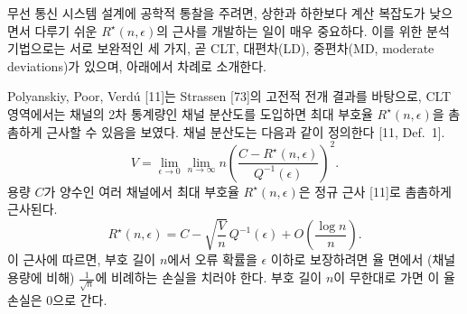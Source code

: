 무선 통신 시스템 설계에 공학적 통찰을 주려면, 상한과 하한보다 계산 복잡도가 낮으면서 다루기 쉬운 $R^\star(n,\epsilon)$의 근사를 개발하는 일이 매우 중요하다. 이를 위한 분석 기법으로는 서로 보완적인 세 가지, 곧 CLT, 대편차(LD), 중편차(MD, moderate deviations)가 있으며, 아래에서 차례로 소개한다.

Polyanskiy, Poor, Verdú [11]는 Strassen [73]의 고전적 전개 결과를 바탕으로, CLT 영역에서는 채널의 2차 통계량인 채널 분산도를 도입하면 최대 부호율 $R^\star(n,\epsilon)$을 촘촘하게 근사할 수 있음을 보였다. 채널 분산도는 다음과 같이 정의한다 [11, Def.~1].
\begin{equation}
V=\lim_{\epsilon\to0}\lim_{n\to\infty}n\left(\frac{C-R^\star(n,\epsilon)}{Q^{-1}(\epsilon)}\right)^{2}. \tag{25}
\end{equation}
용량 $C$가 양수인 여러 채널에서 최대 부호율 $R^\star(n,\epsilon)$은 정규 근사 [11]로 촘촘하게 근사된다.
\begin{equation}
R^\star(n,\epsilon)=C-\sqrt{\frac{V}{n}}\,Q^{-1}(\epsilon)+O\!\left(\frac{\log n}{n}\right). \tag{26}
\end{equation}
이 근사에 따르면, 부호 길이 $n$에서 오류 확률을 $\epsilon$ 이하로 보장하려면 율 면에서 (채널 용량에 비해) $\frac{1}{\sqrt{n}}$에 비례하는 손실을 치러야 한다. 부호 길이 $n$이 무한대로 가면 이 율 손실은 0으로 간다.

